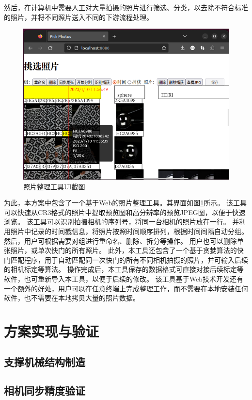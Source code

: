 然后，在计算机中需要人工对大量拍摄的照片进行筛选、分类，以去除不符合标准的照片，并将不同照片送入不同的下游流程处理。
\begin{figure}
\centering
\includegraphics[width=\textwidth,trim={2pt 0 0 5pt},clip]{figures/pick_photo}
\caption{照片整理工具UI截图}
\label{fig:pick_photo}
\end{figure}
为此，本方案中包含了一个基于Web的照片整理工具。其界面如图\ref{fig:pick_photo}所示。
该工具可以快速从CR3格式的照片中提取预览图和高分辨率的预览JPEG图，以便于快速浏览。
该工具可以识别拍摄相机的序列号，将同一台相机的照片放在一行。
并利用照片中记录的时间戳信息，将照片按照时间顺序排列，根据时间间隔自动分组。
然后，用户可根据需要对组进行重命名、删除、拆分等操作。
用户也可以删除单张照片，或单次快门的所有照片。
此外，本工具还包含了一个基于贪婪算法的快门匹配程序，用于自动匹配同一次快门的所有不同相机拍摄的照片，并可输入后续的相机标定等算法。
操作完成后，本工具保存的数据格式可直接对接后续标定等软件，也可重新导入本工具，以便于后续的修改。
该工具基于Web技术开发还有一个额外的好处，用户可以在任意终端上完成整理工作，而不需要在本地安装任何软件，也不需要在本地拷贝大量的照片数据。

\section{方案实现与验证}

\subsection{支撑机械结构制造}

\subsection{相机同步精度验证}

